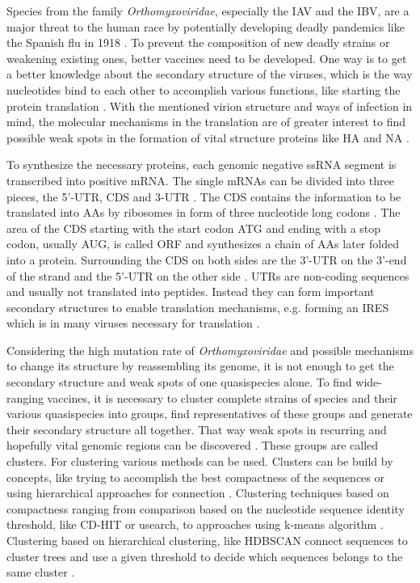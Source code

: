 Species from the family \textit{Orthomyxoviridae}, especially the \gls{IAV} and the \gls{IBV}, are a major threat to the human race by potentially developing deadly pandemics like the Spanish flu in 1918 \autocite{shift}. To prevent the composition of new deadly strains or weakening existing ones, better vaccines need to be developed. One way is to get a better knowledge about the secondary structure of the viruses, which is the way nucleotides bind to each other to accomplish various functions, %
like starting the protein translation \autocite{ires}. With the mentioned virion structure and ways of infection in mind, the molecular mechanisms in the translation are of greater interest to find possible weak spots in the formation of vital structure proteins like \gls{HA} and \gls{NA} \autocite{influenza_all}. 

To synthesize the necessary proteins, each genomic negative \gls{ssRNA} segment is transcribed into positive \gls{mRNA}. The single \glspl{mRNA} can be divided into three pieces, the 5'-\gls{UTR}, \gls{CDS} and 3-\gls{UTR} \autocite{coding}. The \gls{CDS} contains the information to be translated into \glspl{AA} by ribosomes in form of three nucleotide long codons \autocite{buch}. The area of the \gls{CDS} starting with the start codon ATG and ending with a stop codon, usually AUG, is called \gls{ORF} and synthesizes a chain of \glspl{AA} later folded into a protein. Surrounding the \gls{CDS} on both sides are the 3'-\gls{UTR} on the 3'-end of the strand and the 5'-\gls{UTR} on the other side \autocite{buch}. \glspl{UTR} are non-coding sequences and usually not translated into peptides. Instead they can form important secondary structures to enable translation mechanisms, e.g. forming an \gls{IRES} which is in many viruses necessary for translation \autocite{ires}. 

Considering the high mutation rate of \textit{Orthomyxoviridae} and possible mechanisms to change its structure by reassembling its genome, it is not enough to get the secondary structure and weak spots of one quasispecies alone. To find wide-ranging vaccines, it is necessary to cluster complete strains of species and their various quasispecies into groups, find representatives of these groups and generate their secondary structure all together. That way weak spots in recurring and hopefully vital genomic regions can be discovered \autocite{cluster}. These groups are called clusters. For clustering various methods can be used. Clusters can be build by concepts, like trying to accomplish the best compactness of the sequences or using hierarchical approaches for connection \autocite{cluster}. Clustering techniques based on compactness ranging from comparison based on the nucleotide sequence identity threshold, like CD-HIT or usearch, to approaches using k-means algorithm \autocite{cluster, CD-HIT, Usearch, kmeans}. Clustering based on hierarchical clustering, like HDBSCAN connect sequences to cluster trees and use a given threshold to decide which sequences belongs to the same cluster \autocite{hdbscan}. 

